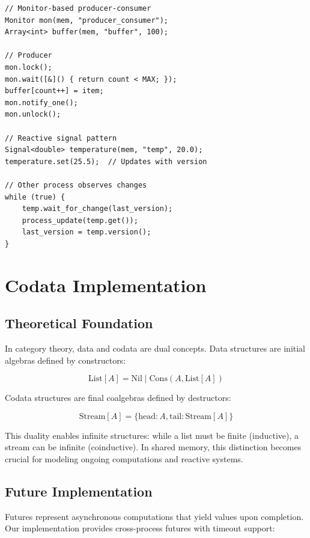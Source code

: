 \documentclass[10pt,conference]{IEEEtran}
\begin{document}
\begin{lstlisting}[caption={Synchronization Primitives Usage},label={lst:sync}]
// Monitor-based producer-consumer
Monitor mon(mem, "producer_consumer");
Array<int> buffer(mem, "buffer", 100);

// Producer
mon.lock();
mon.wait([&]() { return count < MAX; });
buffer[count++] = item;
mon.notify_one();
mon.unlock();

// Reactive signal pattern
Signal<double> temperature(mem, "temp", 20.0);
temperature.set(25.5);  // Updates with version

// Other process observes changes
while (true) {
    temp.wait_for_change(last_version);
    process_update(temp.get());
    last_version = temp.version();
}
\end{lstlisting}

\section{Codata Implementation}

\subsection{Theoretical Foundation}

In category theory, data and codata are dual concepts. Data structures are initial algebras defined by constructors:

\begin{equation}
\text{List}[A] = \text{Nil} \mid \text{Cons}(A, \text{List}[A])
\end{equation}

Codata structures are final coalgebras defined by destructors:

\begin{equation}
\text{Stream}[A] = \{\text{head}: A, \text{tail}: \text{Stream}[A]\}
\end{equation}

This duality enables infinite structures: while a list must be finite (inductive), a stream can be infinite (coinductive). In shared memory, this distinction becomes crucial for modeling ongoing computations and reactive systems.

\subsection{Future Implementation}

Futures represent asynchronous computations that yield values upon completion. Our implementation provides cross-process futures with timeout support:
\end{document}

